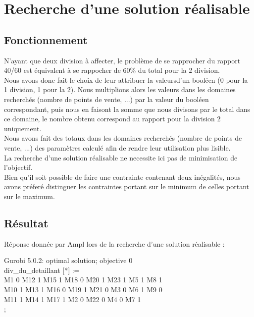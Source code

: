 \documentclass[a4paper,12pt,oneside]{report}
\begin{document}
\chapter{Recherche d'une solution réalisable}

\section{Fonctionnement}

N'ayant que deux division à affecter, le problème de se rapprocher du rapport 40/60 est équivalent à se rappocher de 60\% du total pour la 2\ieme{} division.\\
Nous avons donc fait le choix de leur attribuer la valeursd'un booléen (0 pour la 1\iere{} division, 1 pour la 2\ieme{}). Nous multiplions alors les valeurs dans les domaines
recherchés (nombre de points de vente, ...) par la valeur du booléen correspondant, puis nous en faisont la somme que nous divisons par le total dans ce domaine,
le nombre obtenu correspond au rapport pour la division 2 uniquement.\\

Nous avons fait des totaux dans les domaines recherchés (nombre de points de vente, ...) des paramètres calculé afin de rendre leur utilisation plus lisible.\\
La recherche d'une solution réalisable ne necessite ici pas de minimisation de l'objectif.\\
Bien qu'il soit possible de faire une contrainte contenant deux inégalités, nous avons préferé distinguer les contraintes portant sur le minimum de celles portant sur le maximum.\\

\section{Résultat}
Réponse donnée par Ampl lors de la recherche d'une solution réalisable :
\newline

Gurobi 5.0.2: optimal solution; objective 0\\
div\_du\_detaillant [*] :=\\
 M1 0   M12 1   M15 1   M18 0   M20 1   M23 1    M5 1    M8 1\\
M10 1   M13 1   M16 0   M19 1   M21 0    M3 0    M6 1    M9 0\\
M11 1   M14 1   M17 1    M2 0   M22 0    M4 0    M7 1\\
;\\
\end{document}
